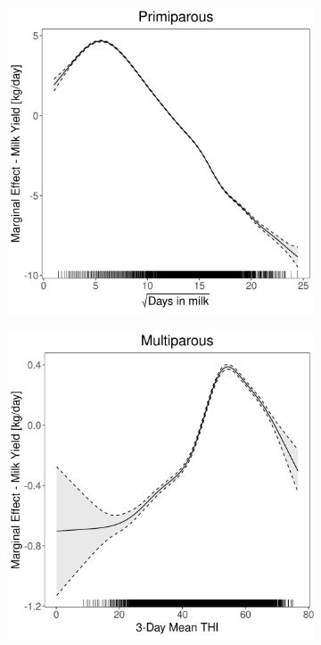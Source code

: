 \begin{figure}[H]
\begin{subfigure}[b]{0.45\textwidth}
    \end{subfigure}
    \hspace{0.05\textwidth} %
    \begin{subfigure}[b]{0.45\textwidth}
        \centering
        \includegraphics[width=\textwidth]{thesis/figures/models/milk/full/sf_milk_full/sf_milk_full_marginal_dim_milk_primi.png}
    \end{subfigure}
    \begin{subfigure}[b]{0.45\textwidth}
        \centering
        \includegraphics[width=\textwidth]{thesis/figures/models/milk/full/sf_milk_full/sf_milk_full_marginal_thi_milk_multi.png}

\end{subfigure}
\end{figure}
